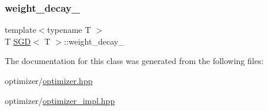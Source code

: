 \subsubsection{\texorpdfstring{weight\_decay\_}{weight\_decay\_}}
{\footnotesize\ttfamily template$<$typename T $>$ \\
T \mbox{\hyperlink{class_s_g_d}{S\+GD}}$<$ T $>$\+::weight\+\_\+decay\+\_\+\hspace{0.3cm}{\ttfamily [protected]}}



The documentation for this class was generated from the following files\+:\begin{DoxyCompactItemize}
\item 
optimizer/\mbox{\hyperlink{optimizer_8hpp}{optimizer.\+hpp}}\item 
optimizer/\mbox{\hyperlink{optimizer__impl_8hpp}{optimizer\+\_\+impl.\+hpp}}\end{DoxyCompactItemize}
